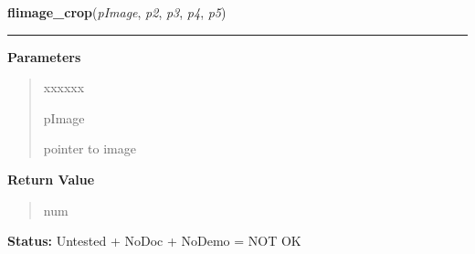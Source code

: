 \hspace{.8\funcindent}\begin{boxedminipage}{\funcwidth}

    \raggedright \textbf{flimage\_crop}(\textit{pImage}, \textit{p2}, \textit{p3}, \textit{p4}, \textit{p5})

    \vspace{-1.5ex}

    \rule{\textwidth}{0.5\fboxrule}
\setlength{\parskip}{2ex}
\setlength{\parskip}{1ex}
      \textbf{Parameters}
      \vspace{-1ex}

      \begin{quote}
        \begin{Ventry}{xxxxxx}

          \item[pImage]

          pointer to image

        \end{Ventry}

      \end{quote}

      \textbf{Return Value}
    \vspace{-1ex}

      \begin{quote}
      num

      \end{quote}

\textbf{Status:} Untested + NoDoc + NoDemo = NOT OK



    \end{boxedminipage}

    \label{xformslib:flflimage:flimage_replace_pixel}

    \vspace{0.5ex}

